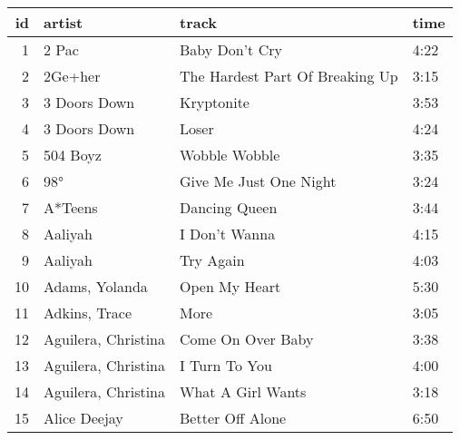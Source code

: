 \begin{tabular}{rlll}
  \toprule
 id & artist & track & time \\ 
  \midrule
    1 & 2 Pac & Baby Don't Cry & 4:22 \\ 
    2 & 2Ge+her & The Hardest Part Of Breaking Up & 3:15 \\ 
    3 & 3 Doors Down & Kryptonite & 3:53 \\ 
    4 & 3 Doors Down & Loser & 4:24 \\ 
    5 & 504 Boyz & Wobble Wobble & 3:35 \\ 
    6 & 98° & Give Me Just One Night & 3:24 \\ 
    7 & A*Teens & Dancing Queen & 3:44 \\ 
    8 & Aaliyah & I Don't Wanna & 4:15 \\ 
    9 & Aaliyah & Try Again & 4:03 \\ 
   10 & Adams, Yolanda & Open My Heart & 5:30 \\ 
   11 & Adkins, Trace & More & 3:05 \\ 
   12 & Aguilera, Christina & Come On Over Baby & 3:38 \\ 
   13 & Aguilera, Christina & I Turn To You & 4:00 \\ 
   14 & Aguilera, Christina & What A Girl Wants & 3:18 \\ 
   15 & Alice Deejay & Better Off Alone & 6:50 \\ 
   \bottomrule
\end{tabular}
